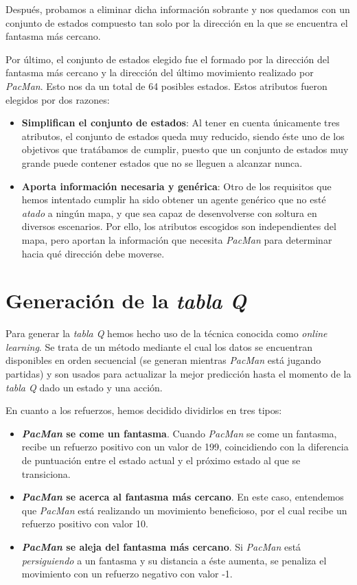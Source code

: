 \documentclass[12pt]{article}
\begin{document}
Después, probamos a eliminar dicha información sobrante y nos quedamos con un conjunto de estados compuesto tan solo por la dirección en la que se encuentra el fantasma más cercano.

Por último, el conjunto de estados elegido fue el formado por la dirección del fantasma más cercano y la dirección del último movimiento realizado por \textit{PacMan}. Esto nos da un total de 64 posibles estados. Estos atributos fueron elegidos por dos razones:
\begin{itemize}
	\item \textbf{Simplifican el conjunto de estados}: Al tener en cuenta únicamente tres atributos, el conjunto de estados queda muy reducido, siendo éste uno de los objetivos que tratábamos de cumplir, puesto que un conjunto de estados muy grande puede contener estados que no se lleguen a alcanzar nunca.
	\item \textbf{Aporta información necesaria y genérica}: Otro de los requisitos que hemos intentado cumplir ha sido obtener un agente genérico que no esté \textit{atado} a ningún mapa, y que sea capaz de desenvolverse con soltura en diversos escenarios. Por ello, los atributos escogidos son independientes del mapa, pero aportan la información que necesita \textit{PacMan} para determinar hacia qué dirección debe moverse.
\end{itemize}

\section{Generación de la \textit{tabla Q}}

Para generar la \textit{tabla Q} hemos hecho uso de la técnica conocida como \textit{online learning}. Se trata de un método mediante el cual los datos se encuentran disponibles en orden secuencial (se generan mientras \textit{PacMan} está jugando partidas) y son usados para actualizar la mejor predicción hasta el momento de la \textit{tabla Q} dado un estado y una acción.

En cuanto a los refuerzos, hemos decidido dividirlos en tres tipos:
\begin{itemize}
	\item \textbf{\textit{PacMan} se come un fantasma}. Cuando \textit{PacMan} se come un fantasma, recibe un refuerzo positivo con un valor de 199, coincidiendo con la diferencia de puntuación entre el estado actual y el próximo estado al que se transiciona.
	\item \textbf{\textit{PacMan} se acerca al fantasma más cercano}. En este caso, entendemos que \textit{PacMan} está realizando un movimiento beneficioso, por el cual recibe un refuerzo positivo con valor 10.
	\item \textbf{\textit{PacMan} se aleja del fantasma más cercano}. Si \textit{PacMan} está \textit{persiguiendo} a un fantasma y su distancia a éste aumenta, se penaliza el movimiento con un refuerzo negativo con valor -1.
\end{itemize}
\end{document}
